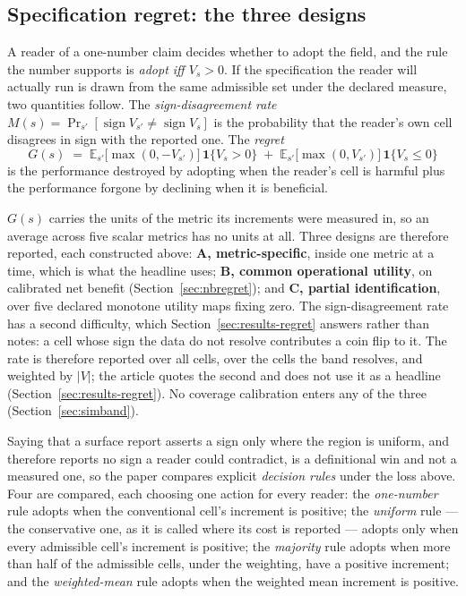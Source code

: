 \subsection{Specification regret: the three designs}
\label{app:regretfull}


A reader of a one-number claim decides whether to adopt the field, and the
rule the number supports is \emph{adopt iff $V_s > 0$}. If the specification
the reader will actually run is drawn from the same admissible set under the
declared measure, two quantities follow. The \emph{sign-disagreement rate}
$M(s) = \Pr_{s'}[\operatorname{sign} V_{s'} \neq \operatorname{sign} V_{s}]$
is the probability that the reader's own cell disagrees in sign with the
reported one. The \emph{regret}
\[
G(s) \;=\;
\mathbb{E}_{s'}\bigl[\max(0, -V_{s'})\bigr]\,\mathbf{1}\{V_s > 0\}
\;+\;
\mathbb{E}_{s'}\bigl[\max(0, V_{s'})\bigr]\,\mathbf{1}\{V_s \leq 0\}
\]
is the performance destroyed by adopting when the reader's cell is harmful
plus the performance forgone by declining when it is beneficial.

$G(s)$ carries the units of the metric its increments were measured in, so
an average across five scalar metrics has no units at all. Three designs
are therefore reported, each constructed above:
\textbf{A, metric-specific}, inside one metric at a time, which is what
the headline uses; \textbf{B, common operational utility}, on calibrated net
benefit (Section~\ref{sec:nbregret}); and \textbf{C, partial identification},
over five declared monotone utility maps fixing zero. The sign-disagreement rate has a
second difficulty, which Section~\ref{sec:results-regret} answers rather than
notes: a cell whose sign the data do not resolve contributes a coin flip to
it. The rate is therefore reported over all cells, over the cells the
band resolves, and weighted by $|V|$; the article quotes the second and
does not use it as a headline (Section~\ref{sec:results-regret}). No coverage calibration enters any of the three
(Section~\ref{sec:simband}).

Saying that a surface report asserts a sign only where the region is uniform,
and therefore reports no sign a reader could contradict, is a definitional win and not a measured
one, so the paper compares explicit \emph{decision rules} under the loss
above. Four are compared, each choosing one action for every reader: the
\emph{one-number} rule adopts when the conventional cell's increment is
positive; the \emph{uniform} rule --- the conservative one, as it is called
where its cost is reported --- adopts only when every admissible cell's
increment is positive; the \emph{majority} rule adopts when more than half
of the admissible cells, under the weighting, have a positive increment; and
the \emph{weighted-mean} rule adopts when the weighted mean increment is
positive.

